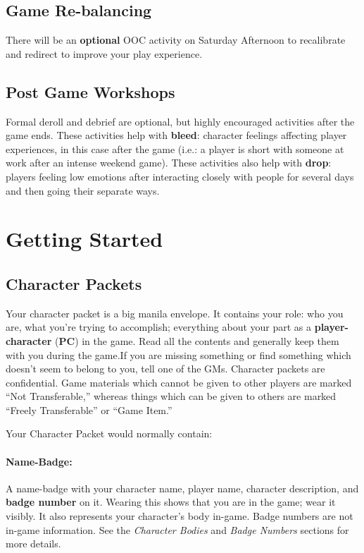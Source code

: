 \documentclass[sheet]{GL2020}
\begin{document}
\subsection{Game Re-balancing}
There will be an \textbf{optional} OOC activity on Saturday Afternoon to recalibrate and redirect to improve your play experience.

\subsection{Post Game Workshops}
Formal deroll and debrief are optional, but highly encouraged activities after the game ends. These activities help with \textbf{bleed}: character feelings affecting player experiences, in this case after the game (i.e.: a player is short with someone at work after an intense weekend game). These activities also help with \textbf{drop}: players feeling low emotions after interacting closely with people for several days and then going their separate ways.

\section{Getting Started}

\subsection{Character Packets}

Your character packet is a big manila envelope.  It contains your role: who you are, what you're trying to accomplish; everything about your part as a {\bf player-character} ({\bf PC}) in the game. Read all the contents and generally keep them with you during the game.If you are missing something or find something which doesn't seem to belong to you, tell one of the GMs.  Character packets are confidential. Game materials which cannot be given to other players are marked ``Not Transferable,'' whereas things which can be given to others are marked ``Freely Transferable'' or ``Game Item.''  %

Your Character Packet would normally contain:
\paragraph{Name-Badge:} A name-badge with your character name, player name, character description, and {\bf badge number} on it. Wearing this shows that you are in the game; wear it visibly.  It also represents your character's body in-game.  Badge numbers are not in-game information. See the \emph{Character Bodies} and \emph{Badge Numbers} sections for more details.
\end{document}
